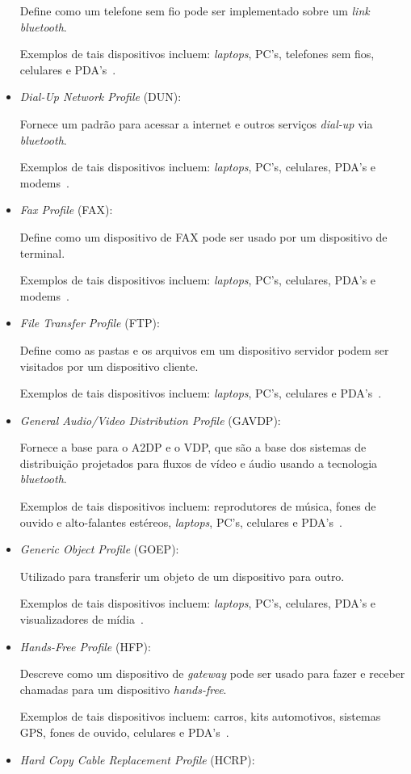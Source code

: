 \begin{itemize}
	Define como um telefone sem fio pode ser implementado sobre um \emph{link} \emph{bluetooth}.

	Exemplos de tais dispositivos incluem: \emph{laptops}, PC's, telefones sem fios, celulares e PDA's~\cite{bluetoothprofilesCTP}.
	\item \emph{Dial-Up Network Profile} (DUN): 

	Fornece um padrão para acessar a internet e outros serviços \emph{dial-up} via \emph{bluetooth}.

	Exemplos de tais dispositivos incluem: \emph{laptops}, PC's, celulares, PDA's e modems~\cite{bluetoothprofilesDUN}.
	\item \emph{Fax Profile} (FAX): 

	Define como um dispositivo de FAX pode ser usado por um dispositivo de terminal.

	Exemplos de tais dispositivos incluem: \emph{laptops}, PC's, celulares, PDA's e modems~\cite{bluetoothprofilesFAX}.
	\item \emph{File Transfer Profile} (FTP): 

	Define como as pastas e os arquivos em um dispositivo servidor podem ser visitados por um dispositivo cliente.

	Exemplos de tais dispositivos incluem: \emph{laptops}, PC's, celulares e PDA's~\cite{bluetoothprofilesFTP}.
	\item \emph{General Audio/Video Distribution Profile} (GAVDP): 

	Fornece a base para o A2DP e o VDP, que são a base dos sistemas de distribuição projetados para fluxos de vídeo e áudio usando a tecnologia \emph{bluetooth}.

	Exemplos de tais dispositivos incluem: reprodutores de música, fones de ouvido e alto-falantes estéreos, \emph{laptops}, PC's, celulares e PDA's~\cite{bluetoothprofilesGAVDP}.
	\item \emph{Generic Object Profile} (GOEP): 

	Utilizado para transferir um objeto de um dispositivo para outro.

	Exemplos de tais dispositivos incluem: \emph{laptops}, PC's, celulares, PDA's e visualizadores de mídia~\cite{bluetoothprofilesGOEP}.
	\item \emph{Hands-Free Profile} (HFP): 

	Descreve como um dispositivo de \emph{gateway} pode ser usado para fazer e receber chamadas para um dispositivo \emph{hands-free}.

	Exemplos de tais dispositivos incluem: carros, kits automotivos, sistemas GPS, fones de ouvido, celulares e PDA's~\cite{bluetoothprofilesHFP}.
	\item \emph{Hard Copy Cable Replacement Profile} (HCRP): 


\end{itemize}
